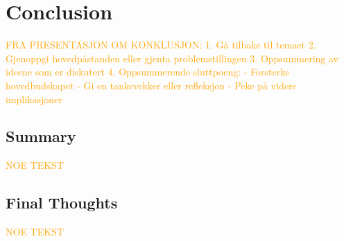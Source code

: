 \chapter{Conclusion}\label{chap:conclusion}

\textcolor{orange}{FRA PRESENTASJON OM KONKLUSJON:
    1. Gå tilbake til temaet
    2. Gjenoppgi hovedpåstanden eller gjenta problemstillingen
    3. Oppsummering av ideene som er diskutert
    4. Oppsummerende sluttpoeng:
        - Forsterke hovedbudskapet
        - Gi en tankevekker eller refleksjon
        - Peke på videre implikasjoner}

\section{Summary}\label{sec:summary}

\textcolor{orange}{NOE TEKST}

\section{Final Thoughts}\label{sec:finalthoughts}

\textcolor{orange}{NOE TEKST}
